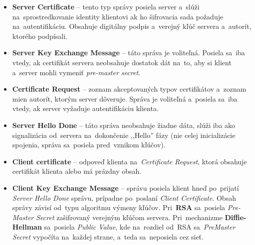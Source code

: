 \begin{itemize}
\begin{enumerate}
\begin{itemize}
            \item \textit{Compression Methods} -- Zoznam podporovaných metód kompresie, dnes už väčšinou prázdne kvôli bezpečnosti~\cite{rfc7525}.
            
            \item \textbf{\textit{Extensions}} -- Zoznam podporovaných rozšírení.
        \end{itemize}
        
        Táto správa je dôležitá pre~ďalšiu časť práce, kde sa~využívajú hlavne rozšírenia (viac v~sekcii \hyperref[th:extensions]{Rozšírenia}).

        \item \textbf{\textit{Server Hello}} -- túto správu posiela server ako odpoveď na~\textit{Client Hello}~(\ref{th:client_hello}), pričom jej obsahom je množina rozšírení (extensions) a~šifrovacích algoritmov, ktorú si server vybral od~možností poskytnutých klientom.
    \end{enumerate}

    \item \textbf{Server Certificate} -- tento typ správy posiela server a~slúži na~sprostredkovanie identity klientovi ak ho šifrovacia sada požaduje na~autentifikáciu. Obsahuje digitálny podpis a~verejný kľúč servera a~autorít, ktorého podpísali.

    \item \textbf{Server Key Exchange Message} -- táto správa je voliteľná. Posiela sa~iba vtedy, ak certifikát servera neobsahuje dostatok dát na~to, aby si klient a~server mohli vymeniť \textit{pre-master secret}.

    \item \textbf{Certificate Request} -- zoznam akceptovaných typov certifikátov a~zoznam mien autorít, ktorým server dôveruje. Správa je voliteľná a~posiela sa~iba vtedy, ak  server vyžaduje autentifikáciu klienta.

    \item \textbf{Server Hello Done} -- táto správa neobsahuje žiadne dáta, slúži iba ako signalizácia od~servera na~dokončenie ,,Hello'' fázy (nie celej inicializácie spojenia, správa sa~posiela pred~vznikom kľúčov).

    \item \textbf{Client certificate} -- odpoveď klienta na~\textit{Certificate Request}, ktorá obsahuje certifikát klienta alebo má prázdny obsah.

    \item \textbf{Client Key Exchange Message}\label{th:client_key_exchange} -- správu posiela klient hneď po~prijatí \textit{Server Hello Done} správu, prípadne po~poslaní \textit{Client Certificate}. Obsah správy závisí od~typu algoritmu výmeny kľúčov. Pri~\textbf{RSA} sa~posiela \textit{Pre-Master Secret} zašifrovaný verejným kľúčom servera. Pri~mechanizme \textbf{Diffie-Hellman} sa~posiela \textit{Public Value}, kde na~rozdiel od~RSA sa~\textit{PreMaster Secret} vypočíta na~každej strane, a~teda sa~neposiela cez sieť.


\end{itemize}
